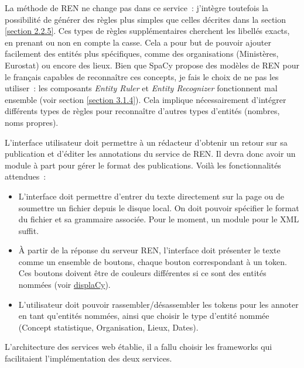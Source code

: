 La méthode de REN ne change pas dans ce service~: j'intègre toutefois la possibilité de générer des règles plus simples que celles décrites dans la section \ref{section 2.2.5}. Ces types de règles supplémentaires cherchent les libellés exacts, en prenant ou non en compte la casse. Cela a pour but de pouvoir ajouter facilement des entités plus spécifiques, comme des organisations (Ministères, Eurostat) ou encore des lieux. Bien que SpaCy propose des modèles de REN pour le français capables de reconnaître ces concepts, je fais le choix de ne pas les utiliser~: les composants \textit{Entity Ruler} et \textit{Entity Recognizer} fonctionnent mal ensemble (voir section \ref{section 3.1.4}). Cela implique nécessairement d'intégrer différents types de règles pour reconnaître d'autres types d'entités (nombres, noms propres). 
\newline

L'interface utilisateur doit permettre à un rédacteur d'obtenir un retour sur sa publication et d'éditer les annotations du service de REN. Il devra donc avoir un module à part pour gérer le format des publications. Voilà les fonctionnalités attendues~:
\vspace{5pt}
\begin{itemize}
    \item L'interface doit permettre d'entrer du texte directement sur la page ou de soumettre un fichier depuis le disque local. On doit pouvoir spécifier le format du fichier et sa grammaire associée. Pour le moment, un module pour le XML suffit.
    \vspace{5pt}
    \item À partir de la réponse du serveur REN, l'interface doit présenter le texte comme un ensemble de boutons, chaque bouton correspondant à un token. Ces boutons doivent être de couleurs différentes si ce sont des entités nommées (voir \href{https://spacy.io/usage/visualizers#ent}{displaCy}\cite{displacy}).
    \vspace{5pt}
    \item L'utilisateur doit pouvoir rassembler/désassembler les tokens pour les annoter en tant qu'entités nommées, ainsi que choisir le type d'entité nommée (Concept statistique, Organisation, Lieux, Dates).
    \newline
\end{itemize}

L'architecture des services web établie, il a fallu choisir les frameworks qui facilitaient l'implémentation des deux services.
\label{section 3.2.1 - Architecture des services}

